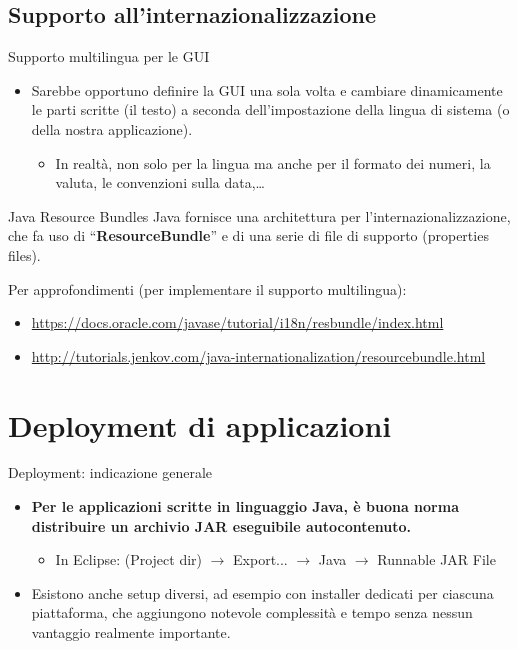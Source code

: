 \documentclass[presentation]{beamer}
\begin{document}
\subsection{Supporto all'internazionalizzazione}

\begin{frame}{Supporto multilingua per le GUI}
\begin{itemize}
\item Sarebbe opportuno definire la GUI una sola volta e cambiare dinamicamente le parti scritte (il testo) a seconda dell'impostazione della lingua di sistema (o della nostra applicazione).
\begin{itemize}
\item In realtà, non solo per la lingua ma anche per il formato dei numeri, la valuta, le convenzioni sulla data,\dots
\end{itemize}
\end{itemize}
\begin{block}{Java Resource Bundles}
Java fornisce una architettura per l'internazionalizzazione, che fa uso di ``\textbf{ResourceBundle}'' e di una serie di file di supporto (properties files).

Per approfondimenti (per implementare il supporto multilingua):
\begin{itemize}
\item \url{https://docs.oracle.com/javase/tutorial/i18n/resbundle/index.html}
\item \url{http://tutorials.jenkov.com/java-internationalization/resourcebundle.html}
\end{itemize}
\end{block}
\end{frame}

\section{Deployment di applicazioni}

\begin{frame}{Deployment: indicazione generale}
\begin{itemize}\itemsep20pt
\item \textbf{Per le applicazioni scritte in linguaggio Java, è buona norma distribuire un archivio JAR eseguibile autocontenuto.}
\begin{itemize}
\item In Eclipse: (Project dir) $\rightarrow$ Export... $\rightarrow$ Java $\rightarrow$ Runnable JAR File
\end{itemize}
\item Esistono anche setup diversi, ad esempio con installer dedicati per ciascuna piattaforma, che aggiungono notevole complessità e tempo senza nessun vantaggio realmente importante.
\end{itemize}

\end{frame}
\end{document}
